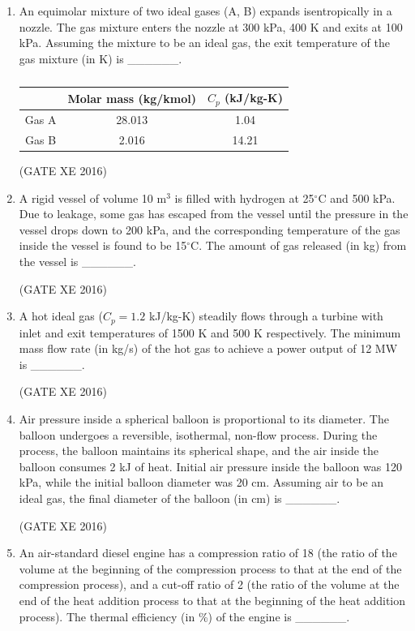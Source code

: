 \documentclass[12pt]{article}
\begin{document}
\begin{enumerate}
(GATE XE 2016)

\item An equimolar mixture of two ideal gases (A, B) expands isentropically in a nozzle. The gas mixture enters the nozzle at 300 kPa, 400 K and exits at 100 kPa. Assuming the mixture to be an ideal gas, the exit temperature of the gas mixture (in K) is \_\_\_\_\_\_.


\begin{table}[H]
\centering
\caption{}
\label{}
\begin{tabular}{|c|c|c|}
\hline
 & Molar mass (kg/kmol) & $C_p$ (kJ/kg-K) \\
\hline
Gas A & 28.013 & 1.04 \\
\hline
Gas B & 2.016 & 14.21 \\
\hline
\end{tabular}
\end{table}

(GATE XE 2016)

\item A rigid vessel of volume 10 m$^3$ is filled with hydrogen at 25$^\circ$C and 500 kPa. Due to leakage, some gas has escaped from the vessel until the pressure in the vessel drops down to 200 kPa, and the corresponding temperature of the gas inside the vessel is found to be 15$^\circ$C. The amount of gas released (in kg) from the vessel is \_\_\_\_\_\_.

(GATE XE 2016)

\item A hot ideal gas ($C_p = 1.2$ kJ/kg-K) steadily flows through a turbine with inlet and exit temperatures of 1500 K and 500 K respectively. The minimum mass flow rate (in kg/s) of the hot gas to achieve a power output of 12 MW is \_\_\_\_\_\_.

(GATE XE 2016)

\item Air pressure inside a spherical balloon is proportional to its diameter. The balloon undergoes a reversible, isothermal, non-flow process. During the process, the balloon maintains its spherical shape, and the air inside the balloon consumes 2 kJ of heat. Initial air pressure inside the balloon was 120 kPa, while the initial balloon diameter was 20 cm. Assuming air to be an ideal gas, the final diameter of the balloon (in cm) is \_\_\_\_\_\_.

(GATE XE 2016)

\item An air-standard diesel engine has a compression ratio of 18 (the ratio of the volume at the beginning of the compression process to that at the end of the compression process), and a cut-off ratio of 2 (the ratio of the volume at the end of the heat addition process to that at the beginning of the heat addition process). The thermal efficiency (in \%) of the engine is \_\_\_\_\_\_.


\end{enumerate}
\end{document}
